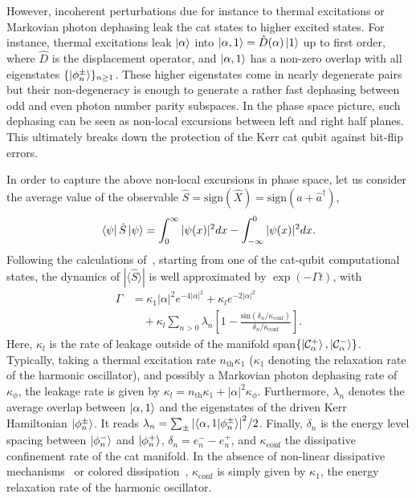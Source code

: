\documentclass[%
 reprint,
 superscriptaddress,
 amsmath,
 amssymb,
 aps,
 pra,
 10pt
]{revtex4-2}
\begin{document}
However, incoherent perturbations due for instance to thermal excitations or Markovian photon dephasing leak the cat states to higher excited states. For instance, thermal excitations leak $\ket{\alpha}$ into $\ket{\alpha,1} = \hat{D}(\alpha) \ket{1}$ up to first order, where $\hat{D}$ is the displacement operator, and $\ket{\alpha,1}$ has a non-zero overlap with all eigenstates $\{\ket{\phi_n^\pm}\}_{n \ge 1}$. These higher eigenstates come in nearly degenerate pairs but their non-degeneracy is enough to generate a rather fast dephasing between odd and even photon number parity subspaces. In the phase space picture, such dephasing can be seen as non-local excursions between left and right half planes. This ultimately breaks down the protection of the Kerr cat qubit against bit-flip errors.

In order to capture the above non-local excursions in phase space, let us consider the average value of the observable $\hat S=\text{sign}(\hat X)=\text{sign}(\hat a+\hat a^\dag)$,
\begin{equation}
    \bra{\psi}\hat S \ket{\psi}=\int_0^\infty |\psi(x)|^2dx-\int_{-\infty}^0 |\psi(x)|^2 dx. 
\end{equation}
Following the calculations of~\cite{Gautier2022}, starting from one of the cat-qubit computational states, the dynamics of $|\langle \hat S\rangle|$ is well approximated by $\exp(-\Gamma t)$, with
\begin{equation}
    \begin{split}
        \Gamma &= \kappa_1|\alpha|^2e^{-4|\alpha|^2} + \kappa_le^{-2|\alpha|^2} \\
        & \quad +\kappa_l\sum_{n>0} \lambda_n \left[ 1- \frac{\text{sin}(\delta_n/\kappa_{\text{conf}}
        )}{\delta_n/\kappa_{\text{conf}}} \right].
        \label{eq:formuleRonan}
    \end{split}
\end{equation}
Here, $\kappa_l$ is the rate of leakage outside of the manifold span$\{\ket{\mathcal{C}_\alpha^+},\ket{\mathcal{C}_\alpha^-}\}$. Typically, taking a thermal excitation rate $n_{\text{th}}\kappa_1$ ($\kappa_1$ denoting the relaxation rate of the harmonic oscillator), and possibly a Markovian photon dephasing rate of $\kappa_\phi$, the leakage rate is given by $\kappa_l=n_{\text{th}}\kappa_1+|\alpha|^2\kappa_\phi$. Furthermore, $\lambda_n$ denotes the average overlap between $\ket{\alpha,1}$ and the eigenstates of the driven Kerr Hamiltonian $\ket{\phi_n^\pm}$. It reads $\lambda_n=\sum_{\pm}\abs{\braket{\alpha,1}{\phi_n^\pm}}^2/2$. Finally, $\delta_n$ is the energy level spacing between $\ket{\phi_n^-}$ and $\ket{\phi_n^+}$, $\delta_n = e^-_n - e^+_n$, and $\kappa_\text{conf}$ the dissipative confinement rate of the cat manifold. In the absence of non-linear dissipative mechanisms~\cite{Mirrahimi2014} or colored dissipation~\cite{Putterman2022}, $\kappa_\text{conf}$ is simply given by $\kappa_1$, the energy relaxation rate of the harmonic oscillator.
\end{document}
